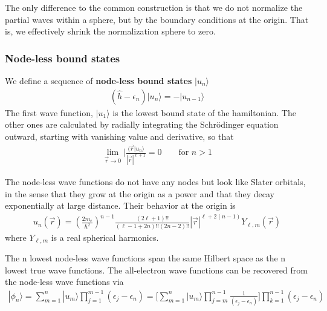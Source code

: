 \documentclass[11pt,a4paper]{report}
\begin{document}
The only difference to the common construction is that we do not
normalize the partial waves within a sphere, but by the boundary
conditions at the origin. That is, we effectively shrink the
normalization sphere to zero.



\subsubsection{Node-less bound states}
We define\cite{bloechl12_arxiv1210_5937} a sequence of
\textbf{node-less bound states}
$|u_n\rangle$
\begin{eqnarray}
(\hat{h}-\epsilon_n)|u_n\rangle=-|u_{n-1}\rangle
\label{eq:nodelesseq}
\end{eqnarray}
The first wave function, $|u_1\rangle$ is the lowest bound state of
the hamiltonian. The other ones are calculated by radially integrating
the Schr\"odinger equation outward, starting with vanishing value and
derivative, so that
\begin{eqnarray}
\lim_{\vec{r}\rightarrow0}|\frac{\langle\vec{r}|u_n\rangle}{|\vec{r}|^{\ell+1}}=0
\qquad\text{for $n>1$}
\end{eqnarray}


The node-less wave functions do not
have any nodes but look like Slater orbitals, in the sense that they
grow at the origin as a power and that they decay exponentially at
large distance. Their behavior at the origin
is\cite{bloechl12_arxiv1210_5937}
\begin{eqnarray}
u_{n}(\vec{r})
=\left(\frac{2m_e}{\hbar^2}\right)^{n-1}
\frac{(2\ell+1)!!}{(\ell-1+2n)!!(2n-2)!!}
|\vec{r}|^{\ell+2(n-1)}Y_{\ell,m}(\vec{r})
\end{eqnarray}
where $Y_{\ell,m}$ is a real spherical harmonics.

The n lowest node-less wave functions span the same Hilbert space as
the n lowest true wave functions. The all-electron wave functions can
be recovered from the node-less wave functions
via\cite{bloechl12_arxiv1210_5937}
\begin{eqnarray}
|\phi_n\rangle=\sum_{m=1}^n|u_m\rangle \prod_{j=1}^{m-1}(\epsilon_j-\epsilon_n)
=\biggl[\sum_{m=1}^n|u_m\rangle 
\prod_{j=m}^{n-1}\frac{1}{(\epsilon_j-\epsilon_n)}
\biggr]\prod_{k=1}^{n-1}(\epsilon_j-\epsilon_n)
\end{eqnarray}
\end{document}

